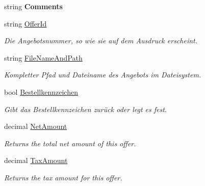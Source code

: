\begin{DoxyCompactItemize}
\item 
string {\bfseries Comments}\hypertarget{class_products_1_1_model_1_1_entities_1_1_offer_a8739038b1b454d320257be0ae833b929}{}\label{class_products_1_1_model_1_1_entities_1_1_offer_a8739038b1b454d320257be0ae833b929}

\item 
string \hyperlink{class_products_1_1_model_1_1_entities_1_1_offer_ac483c8d84127046f48154b9f4c6995ff}{Offer\+Id}
\begin{DoxyCompactList}\small\item\em Die Angebotsnummer, so wie sie auf dem Ausdruck erscheint. \end{DoxyCompactList}\item 
string \hyperlink{class_products_1_1_model_1_1_entities_1_1_offer_a51b9fd09135bf67afefdb1acfa60d430}{File\+Name\+And\+Path}
\begin{DoxyCompactList}\small\item\em Kompletter Pfad und Dateiname des Angebots im Dateisystem. \end{DoxyCompactList}\item 
bool \hyperlink{class_products_1_1_model_1_1_entities_1_1_offer_afcabf62297b60797af2d9b10cd4b2db8}{Bestellkennzeichen}
\begin{DoxyCompactList}\small\item\em Gibt das Bestellkennzeichen zurück oder legt es fest. \end{DoxyCompactList}\item 
decimal \hyperlink{class_products_1_1_model_1_1_entities_1_1_offer_aedbeda8f1e3b2df97015839fa504b474}{Net\+Amount}
\begin{DoxyCompactList}\small\item\em Returns the total net amount of this offer. \end{DoxyCompactList}\item 
decimal \hyperlink{class_products_1_1_model_1_1_entities_1_1_offer_af1c3e80fef5bb8cce6b9edb8f88b8aa8}{Tax\+Amount}
\begin{DoxyCompactList}\small\item\em Returns the tax amount for this offer. \end{DoxyCompactList}\item 

\end{DoxyCompactItemize}

